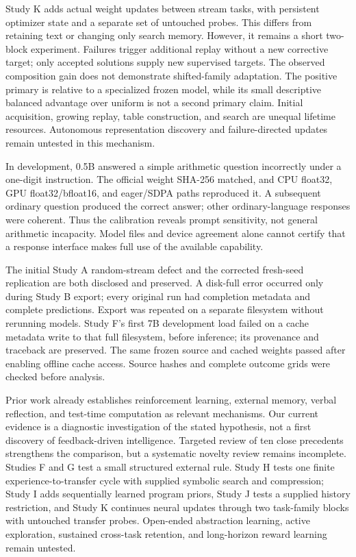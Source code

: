 \documentclass[11pt]{article}
\begin{document}
Study K adds actual weight updates between stream tasks, with persistent
optimizer state and a separate set of untouched probes. This differs from
retaining text or changing only search memory. However, it remains a short
two-block experiment. Failures trigger additional replay without a new
corrective target; only accepted solutions supply new supervised targets.
The observed composition gain does not demonstrate shifted-family adaptation.
The positive primary is relative to a specialized frozen model, while its
small descriptive balanced advantage over uniform is not a second primary
claim. Initial acquisition, growing replay, table construction, and search
are unequal lifetime resources. Autonomous representation discovery and
failure-directed updates remain untested in this mechanism.

In development, 0.5B answered a simple arithmetic question incorrectly under
a one-digit instruction. The official weight SHA-256 matched, and CPU float32,
GPU float32/bfloat16, and eager/SDPA paths reproduced it. A subsequent ordinary
question produced the correct answer; other ordinary-language responses were
coherent. Thus the calibration reveals prompt sensitivity, not general
arithmetic incapacity. Model files and device agreement alone cannot certify
that a response interface makes full use of the available capability.

The initial Study A random-stream defect and the corrected fresh-seed
replication are both disclosed and preserved. A disk-full error occurred only
during Study B export; every original run had completion metadata and complete
predictions. Export was repeated on a separate filesystem without rerunning
models. Study F's first 7B development load failed on a cache metadata write
to that full filesystem, before inference; its provenance and traceback are
preserved. The same frozen source and cached weights passed after enabling
offline cache access. Source hashes and complete outcome grids were checked
before analysis.

Prior work already establishes reinforcement learning, external memory,
verbal reflection, and test-time computation as relevant mechanisms. Our
current evidence is a diagnostic investigation of the stated hypothesis, not
a first discovery of feedback-driven intelligence. Targeted review of ten
close precedents strengthens the comparison, but a systematic novelty review
remains incomplete. Studies F and G test a small structured external rule.
Study H tests one finite experience-to-transfer cycle with supplied symbolic
search and compression; Study I adds sequentially learned program priors,
Study J tests a supplied history restriction, and Study K continues neural
updates through two task-family blocks with untouched transfer probes.
Open-ended abstraction learning, active exploration,
sustained cross-task retention, and long-horizon reward learning remain untested.
\end{document}

